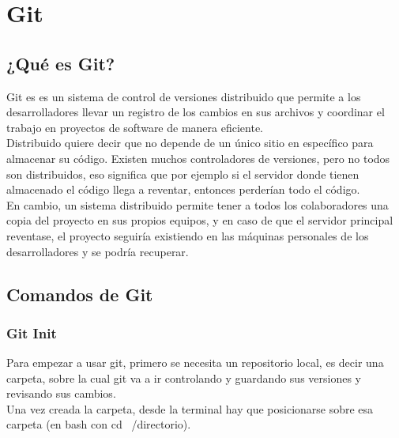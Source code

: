 \chapter{Git}
\section{¿Qué es Git?}
Git es es un sistema de control de versiones distribuido que permite a los desarrolladores llevar un registro de los cambios en sus archivos y coordinar el trabajo en proyectos de software de manera eficiente.\\

Distribuido quiere decir que no depende de un único sitio en específico para almacenar su código. Existen muchos controladores de versiones, pero no todos son distribuidos, eso significa que por ejemplo si el servidor donde tienen almacenado el código llega a reventar, entonces perderían todo el código.\\

En cambio, un sistema distribuido permite tener a todos los colaboradores una copia del proyecto en sus propios equipos, y en caso de que el servidor principal reventase, el proyecto seguiría existiendo en las máquinas personales de los desarrolladores y se podría recuperar.

\section{Comandos de Git}

\subsection{Git Init}
Para empezar a usar git, primero se necesita un repositorio local, es decir una carpeta, sobre la cual git va a ir controlando y guardando sus versiones y revisando sus cambios.\\

Una vez creada la carpeta, desde la terminal hay que posicionarse sobre esa carpeta (en bash con cd ~/directorio).\\

